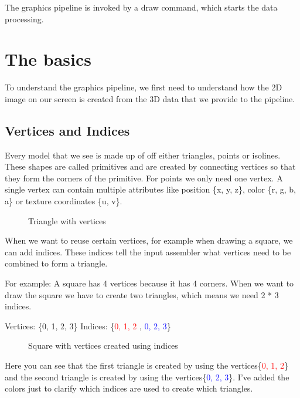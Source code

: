 \documentclass[12pt]{report} \usepackage{preamble}
\begin{document}
The graphics pipeline is invoked by a draw command, which starts the
data processing. \cite{build-pipeline}

\section{The basics}

To understand the graphics pipeline, we first need to understand
how the 2D image on our screen is created from the 3D data that we
provide to the pipeline.

\subsection{Vertices and Indices}

Every model that we see is made up of off either triangles, points or
isolines. These shapes are called primitives and are created by connecting
vertices so that they form the corners of the primitive. For points we
only need one vertex.
A single vertex can contain multiple attributes like position \{x, y, z\},
color \{r, g, b, a\} or texture coordinates \{u, v\}. \cite{vulkan-vertex-input}

\begin{figure}[hbtp]
	\centering 
	\caption{Triangle with vertices}
\end{figure} \floatbarrier

When we want to reuse certain vertices, for example when
drawing a square, we can add indices.  These indices tell the
input assembler what vertices need to be combined to form a
triangle. \cite{vulkan-tutorial-index-buffer}

For example: A square has 4 vertices because it has 4 corners. When we want
to draw the square we have to create two triangles, which means we need 2 *
3 indices.

Vertices: \{0, 1, 2, 3\} Indices: \{\textcolor{red}{0, 1, 2} ,
\textcolor{blue}{0, 2, 3}\}

\begin{figure}[hbtp]
	\centering 
	\caption{Square
		with vertices created using indices}
\end{figure} \floatbarrier

Here you can see that the first triangle is created by using the
vertices\{\textcolor{red}{0, 1, 2}\} and the second triangle is created by using
the vertices\{\textcolor{blue}{0, 2, 3}\}. I've added the colors just
to clarify which indices are used to create which triangles.
\end{document}
